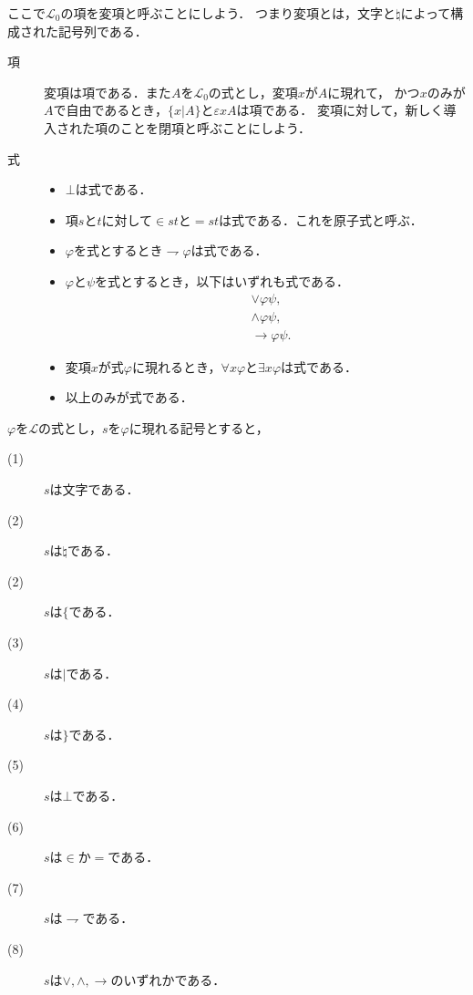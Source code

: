 \documentclass[a4j,10.5pt,oneside,openany]{jsbook}
\theoremstyle{mystyle}
\begin{document}
	ここで$\mathcal{L}_{0}$の項を変項と呼ぶことにしよう．
	つまり変項とは，文字と$\natural$によって構成された記号列である．
	
	\begin{description}
		\item[項] 変項は項である．また$A$を$\mathcal{L}_{0}$の式とし，変項$x$が$A$に現れて，
			かつ$x$のみが$A$で自由であるとき，$\{x|A\}$と$\varepsilon x A$は項である．
			変項に対して，新しく導入された項のことを閉項と呼ぶことにしよう．
			
		\item[式] 
			\begin{itemize}
				\item $\bot$は式である．
				\item 項$s$と$t$に対して$\in st$と$=st$は式である．これを原子式と呼ぶ．
				\item $\varphi$を式とするとき$\rightharpoondown \varphi$は式である．
				\item $\varphi$と$\psi$を式とするとき，以下はいずれも式である．
					\begin{align}
						&\vee \varphi \psi, \\
						&\wedge \varphi \psi, \\
						&\rightarrow \varphi \psi.
					\end{align}
			
				\item 変項$x$が式$\varphi$に現れるとき，$\forall x \varphi$と$\exists x \varphi$は式である．
			
				\item 以上のみが式である．
		\end{itemize}
	\end{description}
	
	$\varphi$を$\mathcal{L}$の式とし，$s$を$\varphi$に現れる記号とすると，
	\begin{description}
		\item[(1)] $s$は文字である．
		\item[(2)] $s$は$\natural$である．
		\item[(2)] $s$は$\{$である．
		\item[(3)] $s$は$|$である．
		\item[(4)] $s$は$\}$である．
		\item[(5)] $s$は$\bot$である．
		\item[(6)] $s$は$\in$か$=$である．
		\item[(7)] $s$は$\rightharpoondown$である．
		\item[(8)] $s$は$\vee,\wedge,\rightarrow$のいずれかである．
	\end{description}
	
\end{document}
